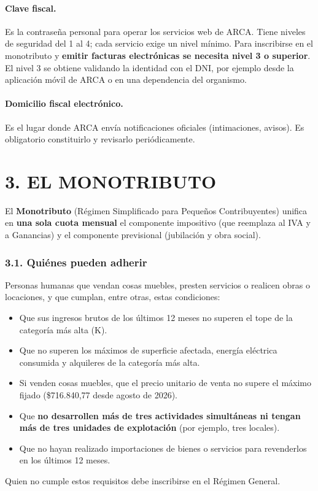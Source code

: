 \paragraph*{Clave fiscal.}
Es la contraseña personal para operar los servicios web de ARCA. Tiene niveles de seguridad
del 1 al 4; cada servicio exige un nivel mínimo. Para inscribirse en el monotributo y
\textbf{emitir facturas electrónicas se necesita nivel 3 o superior}. El nivel 3 se obtiene
validando la identidad con el DNI, por ejemplo desde la aplicación móvil de ARCA o en una
dependencia del organismo.

\paragraph*{Domicilio fiscal electrónico.}
Es el lugar donde ARCA envía notificaciones oficiales (intimaciones, avisos). Es obligatorio
constituirlo y revisarlo periódicamente.

\section*{3. EL MONOTRIBUTO}

\begin{recuadro}
El \textbf{Monotributo} (Régimen Simplificado para Pequeños Contribuyentes) unifica en
\textbf{una sola cuota mensual} el componente impositivo (que reemplaza al IVA y a
Ganancias) y el componente previsional (jubilación y obra social).
\end{recuadro}

\subsubsection*{3.1. Quiénes pueden adherir}
Personas humanas que vendan cosas muebles, presten servicios o realicen obras o locaciones,
y que cumplan, entre otras, estas condiciones:
\begin{itemize}
  \item Que sus ingresos brutos de los últimos 12 meses no superen el tope de la categoría
        más alta (K).
  \item Que no superen los máximos de superficie afectada, energía eléctrica consumida y
        alquileres de la categoría más alta.
  \item Si venden cosas muebles, que el precio unitario de venta no supere el máximo fijado
        (\$716.840,77 desde agosto de 2026).
  \item Que \textbf{no desarrollen más de tres actividades simultáneas ni tengan más de tres
        unidades de explotación} (por ejemplo, tres locales).
  \item Que no hayan realizado importaciones de bienes o servicios para revenderlos en los
        últimos 12 meses.
\end{itemize}
Quien no cumple estos requisitos debe inscribirse en el Régimen General.

